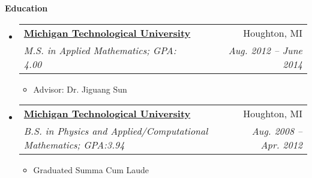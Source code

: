 \documentclass[letterpaper,11pt]{article}
\makeatletter
\newcommand{\resitem}[1]{\item #1 \vspace{-2pt}}
\newcommand{\resheading}[1]{{\large \textbf{#1}}}
\newcommand{\ressubheading}[4]{
\begin{tabular*}{6.5in}{l@{\extracolsep{\fill}}r}
		\textbf{#1} & #2 \\
		\textit{#3} & \textit{#4} \\
\end{tabular*}\vspace{-6pt}}
\makeatother
\begin{document}
\resheading{Education}
	\begin{itemize}
		\item
			\ressubheading{\href{www.mtu.edu}{Michigan Technological University}}{Houghton, MI}{M.S. in Applied Mathematics; GPA: 4.00}{Aug. 2012 -- June 2014}
				{ \footnotesize
				\begin{itemize}
					\resitem{Advisor: Dr. Jiguang Sun} 
				\end{itemize}
				}
		\item
			\ressubheading{\href{www.mtu.edu}{Michigan Technological University}}{Houghton, MI}{B.S. in Physics and Applied/Computational Mathematics; GPA:3.94}{Aug. 2008 -- Apr. 2012}
				{ \footnotesize
				\begin{itemize}
					\resitem{Graduated Summa Cum Laude} 
				\end{itemize}
				}
\begin{comment}%
		\item
			\ressubheading{\href{http://www.isd12.org/chs/}{Centennial High School}}{Circle Pines, MN}{GPA:3.79}{Sep. 2003 - June 2008}
				{ \footnotesize
				\begin{itemize}
				\resitem{Graduated with honors}
				\end{itemize}
				}
\end{comment}
	\end{itemize} %

\end{document}
